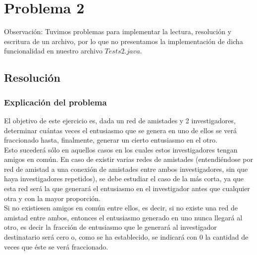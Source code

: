 \section{Problema 2}
\indent Observación: Tuvimos problemas para implementar la lectura, resolución y escritura de un archivo, por lo que no presentamos la implementación de dicha funcionalidad en nuestro archivo $Tests2.java$.


\subsection{Resolución}

\subsubsection{Explicación del problema}
\indent El objetivo de este ejercicio es, dada un red de amistades y 2
investigadores, determinar cuántas veces el entusiasmo que se genera en uno de
ellos se verá fraccionado hasta, finalmente, generar un cierto entusiasmo en el
otro. \\
\indent Esto sucederá sólo en aquellos casos en los cuales estos investigadores
tengan amigos en común. En caso de existir varias redes de amistades
(entendiéndose por red de amistad a una conexión de amistades entre ambos
investigadores, sin que haya investigadores repetidos), se debe estudiar el caso
de la más corta, ya que esta red será la que generará el entusiasmo en el
investigador antes que cualquier otra y con la mayor proporción. \\
\indent Si no existiesen amigos en común entre ellos, es decir, si no existe una
red de amistad entre ambos, entonces el entusiasmo generado en uno nunca llegará
al otro, es decir la fracción de entusiasmo que le generará al investigador
destinatario será cero o, como se ha establecido, se indicará con $0$ la
cantidad de veces que éste se verá fraccionado.

